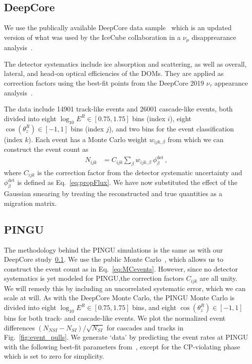 \documentclass{article}
\newcommand{\zreco}{\ensuremath{\cos{(\theta_z^{R})}}}
\newcommand{\Ereco}{E^{R}}
\begin{document}
\subsection{DeepCore}\label{ch:DCmethod} %
We use the publically available DeepCore data sample~\cite{DC2019data} which is an updated version of what was used by the 
IceCube collaboration in a $\nu_\mu$ disapprearance analysis~\cite{DC2018mudisappearance}.

The detector systematics include ice absorption and scattering, as well as overall, lateral, and head-on optical efficiencies of the DOMs. 
They are applied as correction factors using the best-fit points from the DeepCore 2019 $\nu_\tau$ appearance 
analysis~\cite{DC2019tauappearance}.

The data include 14901 track-like events and 26001 cascade-like events, both divided into eight 
$ \log_{10}\Ereco \in [0.75,1.75]$ bins (index $i$), eight $\zreco \in [-1,1]$ bins (index $j$), and two bins for the event classification (index $k$). 
Each event has a Monte Carlo weight $w_{ijk,\beta}$ from which we can construct the event count as
\begin{align}\label{eq:MCevents}
    N_{ijk} &= C_{ijk}\sum_{\beta}w_{ijk,\beta}\, \phi_\beta^\text{det}\,,
\end{align}
where $C_{ijk}$ is the correction factor from the detector systematic uncertainty and $\phi_\beta^\text{det}$ is defined as Eq.~\ref{eq:propFlux}. 
We have now substituted the effect of the Gaussian smearing by treating the reconstructed and true quantities as a migration matrix. 

\subsection{PINGU}\label{ch:PINGUmethod} %
The methodology behind the PINGU simulations is the same as with our DeepCore study~\ref{ch:DCmethod}. We use the public Monte Carlo~\cite{PINGUdata}, 
which allows us to construct the event count as in Eq.~\ref{eq:MCevents}.
However, since no detector systematics is yet modeled for PINGU,the correction factors $C_{ijk}$ are all unity. We will remedy this by including an uncorrelated systematic error,
which we can scale at will.
As with the DeepCore Monte Carlo, the PINGU Monte Carlo is divided into eight 
$\log_{10}\Ereco \in [0.75,1.75]$ bins, and eight $\zreco \in [-1,1]$ bins for both track- and cascade-like events. 
We plot the normalized event differences $(N_{NSI} - N_{SI})/\sqrt{N_{SI}}$ for cascades and tracks in Fig.~\ref{fig:event_pulls}.
We generate `data' by predicting the event rates at PINGU with the following best-fit parameters from~\cite{nufit}, except for the CP-violating phase which is set to zero for simplicity.
\end{document}
